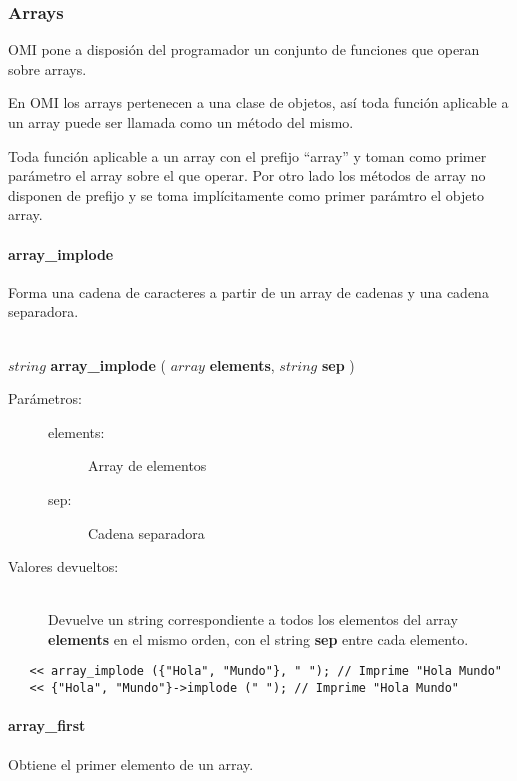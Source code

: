 \subsubsection{Arrays}
OMI pone a disposión del programador un conjunto de funciones que operan sobre arrays.

En OMI los arrays pertenecen a una clase de objetos, así toda función aplicable a un array
puede ser llamada como un método del mismo. 

Toda función aplicable a un array con el prefijo ``array'' y toman como primer parámetro el array sobre el que 
operar. Por otro lado los métodos de array no disponen de prefijo y se toma implícitamente como primer parámtro el objeto 
array.

\paragraph{array\_implode}
Forma una cadena de caracteres a partir de un array de cadenas y una cadena separadora. 

\begin{framed}
\hfill \\ $string$ \textbf{array\_implode} ( $array$ \textbf{elements}, $string$ \textbf{sep} )  
\begin{description}
\item [Parámetros:] \hfill 
   \begin{description}
   \item[elements:] Array de elementos
   \item[sep:] Cadena separadora
   \end{description}
\item[Valores devueltos:] \hfill \\
   Devuelve un string correspondiente a todos los elementos del array \textbf{elements} en el mismo orden, con el string \textbf{sep} entre cada elemento. 
\end{description}
\end{framed}
     
\begin{lstlisting}   
   << array_implode ({"Hola", "Mundo"}, " "); // Imprime "Hola Mundo"
   << {"Hola", "Mundo"}->implode (" "); // Imprime "Hola Mundo"
\end{lstlisting}

\paragraph{array\_first}
Obtiene el primer elemento de un array. 

